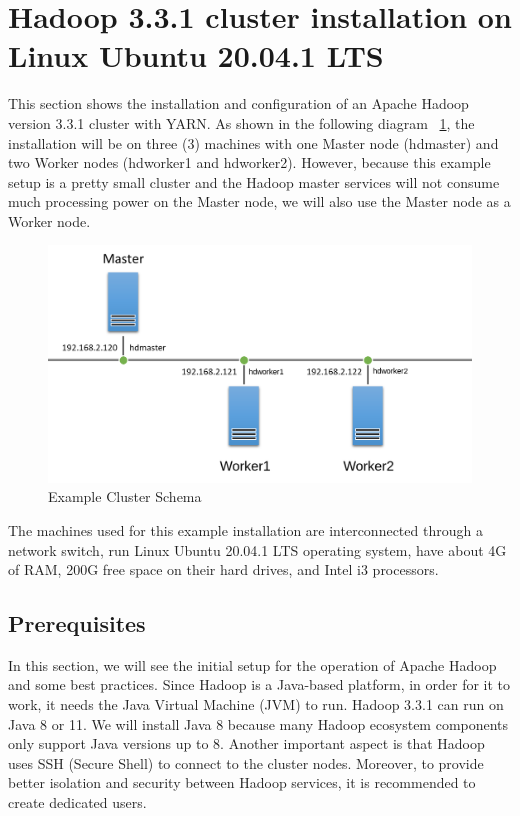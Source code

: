 \documentclass[12pt,english]{book}
\begin{document}
\section{Hadoop 3.3.1 cluster installation on Linux Ubuntu 20.04.1 LTS}


This section shows the installation and configuration of an Apache Hadoop version 3.3.1 cluster with YARN. As shown in the following diagram ~\ref{fig:clusterSchema}, the installation will be on three (3) machines with one Master node (hdmaster) and two Worker nodes (hdworker1 and hdworker2).
However, because this example setup is a pretty small cluster and the Hadoop master services will not consume much processing power on the Master node, we will also use the Master node as a Worker node.

\begin{figure}[ht]
	\centering
	\includegraphics[width=\linewidth]{clusterSchema.png}
	\caption{Example Cluster Schema}
\label{fig:clusterSchema}
\end{figure}

The machines used for this example installation are interconnected through a network switch, run Linux Ubuntu 20.04.1 LTS operating system, have about 4G of RAM, 200G free space on their hard drives, and Intel i3 processors.


\subsection{Prerequisites}


In this section, we will see the initial setup for the operation of Apache Hadoop and some best practices.
Since Hadoop is a Java-based platform, in order for it to work, it needs the Java Virtual Machine (JVM) to run.
Hadoop 3.3.1 can run on Java 8 or 11.
We will install Java 8 because many Hadoop ecosystem components only support Java versions up to 8.
Another important aspect is that Hadoop uses SSH (Secure Shell) to connect to the cluster nodes.
Moreover, to provide better isolation and security between Hadoop services, it is recommended to create dedicated users.
\end{document}

